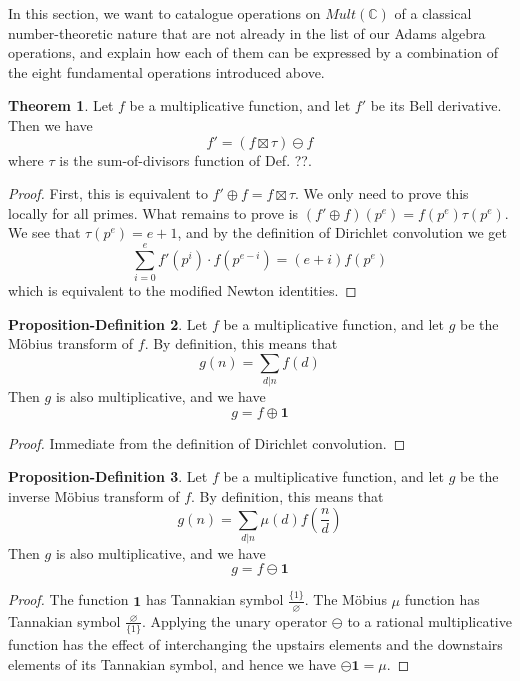 \documentclass[a4paper]{article}
\theoremstyle{definition}
\newtheorem{theorem}{Theorem}[section]
\newtheorem*{corollary}{Corollary}
\newtheorem{propdef}[theorem]{Proposition-Definition}
\theoremstyle{remark}
\newcommand{\one}{\mathbf{1}}
\newcommand{\C}{\mathbb{C}}
\begin{document}
In this section, we want to catalogue operations on $Mult(\C)$ of a classical number-theoretic nature that are not already in the list of our Adams algebra operations, and explain how each of them can be expressed by a combination of the eight fundamental operations introduced above. 

\begin{theorem}
Let $f$ be a multiplicative function, and let $f'$ be its Bell derivative. Then we have
$$   f' = (f \boxtimes \tau) \ominus  f  $$  
where $\tau$ is the sum-of-divisors function of Def. ??.
\end{theorem}

\begin{proof}
First, this is equivalent to $f' \oplus f = f \boxtimes \tau$. We only need to prove this locally for all primes. What remains to prove is $(f' \oplus f)(p^e) = f(p^e) \tau(p^e)$. We see that $\tau(p^e) = e + 1$, and by the definition of Dirichlet convolution we get 
$$\sum_{i = 0}^e f'(p^i) \cdot f(p^{e - i}) = (e + i)f(p^e)$$
which is equivalent to the modified \todo{} Newton identities.
\end{proof}



\begin{propdef}
Let $f$ be a multiplicative function, and let $g$ be the M{\"o}bius transform of $f$. By definition, this means that
$$  g(n) = \sum_{d \vert n} f(d)  $$
Then $g$ is also multiplicative, and we have
$$  g = f \oplus \one   $$
\end{propdef}
\begin{proof}
Immediate from the definition of Dirichlet convolution.
\end{proof}

\begin{propdef}
Let $f$ be a multiplicative function, and let $g$ be the inverse M{\"o}bius transform of $f$. By definition, this means that
$$  g(n) = \sum_{d \vert n} \mu(d) f(\frac{n}{d})  $$
Then $g$ is also multiplicative, and we have
$$  g = f \ominus \one   $$
\end{propdef}
\begin{proof}
The function $\one$ has Tannakian symbol $\frac{ \{  1 \} }{ \varnothing }$. The M{\"o}bius $\mu$ function has Tannakian symbol $\frac{ \varnothing }{ \{  1 \} }$. Applying the unary operator $\ominus$ to a rational multiplicative function has the effect of interchanging the upstairs elements and the downstairs elements of its Tannakian symbol, and hence we have $\ominus \one = \mu$.
\end{proof}
\end{document}
